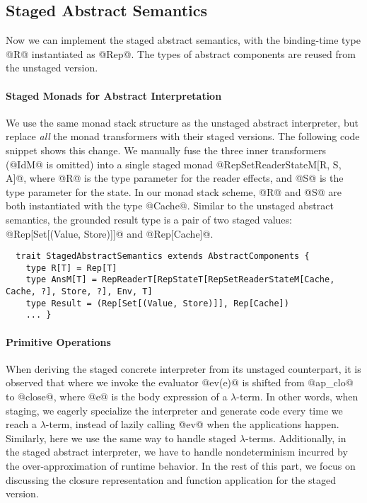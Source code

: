 \subsection{Staged Abstract Semantics}

Now we can implement the staged abstract semantics, with the binding-time
type @R@ instantiated as @Rep@. The types of abstract components are reused
from the unstaged version.

\paragraph{Staged Monads for Abstract Interpretation}
We use the same monad stack structure as the unstaged abstract interpreter,
but replace \textit{all} the monad transformers with their staged versions. The
following code snippet shows this change.
We manually fuse the three inner transformers (@IdM@ is omitted) into a single staged
monad @RepSetReaderStateM[R, S, A]@, where @R@ is the type parameter for the
reader effects, and @S@ is the type parameter for the state.  In our monad stack scheme,
@R@ and @S@ are both instantiated with the type @Cache@. Similar to the unstaged
abstract semantics, the grounded result type is a pair of two staged values:
@Rep[Set[(Value, Store)]]@ and @Rep[Cache]@.
\begin{lstlisting}
  trait StagedAbstractSemantics extends AbstractComponents {
    type R[T] = Rep[T]
    type AnsM[T] = RepReaderT[RepStateT[RepSetReaderStateM[Cache, Cache, ?], Store, ?], Env, T]
    type Result = (Rep[Set[(Value, Store)]], Rep[Cache])
    ... }
\end{lstlisting}

\paragraph{Primitive Operations} 
When deriving the staged concrete interpreter from its unstaged counterpart, it
is observed that where we invoke the evaluator @ev(e)@ is shifted
from @ap_clo@ to @close@, where @e@ is the body expression of a $\lambda$-term.
In other words, when staging, we eagerly specialize the interpreter and
generate code every time we reach a $\lambda$-term, instead of lazily
calling @ev@ when the applications happen.  Similarly, here we use the same way
to handle staged $\lambda$-terms.  Additionally, in the staged abstract
interpreter, we have to handle nondeterminism incurred by the
over-approximation of runtime behavior.  In the rest of this part, we 
focus on discussing the closure representation and function
application for the staged version.

